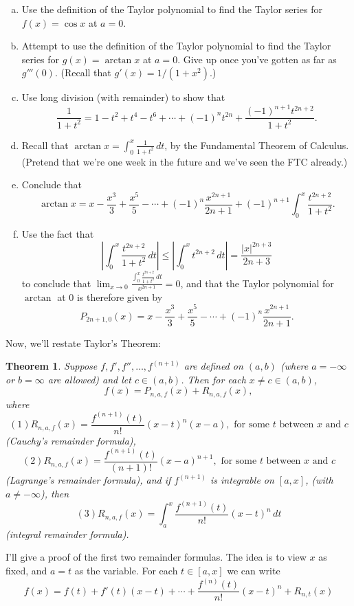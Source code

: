 \documentclass[letterpaper,12pt]{article}
\newtheorem{theorem}{Theorem}
\newcommand{\abs}[1]{\lvert #1\rvert}
\newcommand{\Abs}[1]{\left| #1 \right|}
\begin{document}
\begin{enumerate}[(a)]
 \item Use the definition of the Taylor polynomial to find the Taylor series for $f(x)=\cos x$ at $a=0$.
 \item Attempt to use the definition of the Taylor polynomial to find the Taylor series for $g(x)=\arctan x$ at $a=0$. Give up once you've gotten as far as $g'''(0)$. (Recall that $g'(x) = 1/(1+x^2)$.)
 \item Use long division (with remainder) to show that
\[
 \frac{1}{1+t^2} = 1-t^2+t^4-t^6+\cdots+(-1)^nt^{2n}+\frac{(-1)^{n+1}t^{2n+2}}{1+t^2}.
\]
 \item Recall that $\displaystyle \arctan x = \int_0^x\frac{1}{1+t^2}\,dt$, by the Fundamental Theorem of Calculus. (Pretend that we're one week in the future and we've seen the FTC already.)
 \item Conclude that
\[
 \arctan x = x-\frac{x^3}{3}+\frac{x^5}{5}-\cdots + (-1)^n\frac{x^{2n+1}}{2n+1}+(-1)^{n+1}\int_0^x \frac{t^{2n+2}}{1+t^2}.
\]
 \item Use the fact that
\[
 \Abs{\int_0^x\frac{t^{2n+2}}{1+t^2}\,dt}\leq \Abs{\int_0^xt^{2n+2}\,dt} = \frac{\abs{x}^{2n+3}}{2n+3}
\]
to conclude that $\displaystyle \lim_{x\to 0}\frac{\displaystyle \int_0^x \frac{t^{2n+2}}{1+t^2}\,dt}{x^{2n+1}} = 0$, and that the Taylor polynomial for $\arctan$ at 0 is therefore given by
\[
 P_{2n+1,0}(x) = x-\frac{x^3}{3}+\frac{x^5}{5}-\cdots+(-1)^n\frac{x^{2n+1}}{2n+1}.
\]

\end{enumerate}
Now, we'll restate Taylor's Theorem:
\begin{theorem}
 Suppose $f, f', f'', \ldots, f^{(n+1)}$ are defined on $(a,b)$ (where $a=-\infty$ or $b=\infty$ are allowed) and let $c\in (a,b)$. Then for each $x\neq c\in (a,b)$,
\[
 f(x) = P_{n,a,f}(x)+R_{n,a,f}(x), 
\]
where
\[
 (1) R_{n,a,f}(x)  = \frac{f^{(n+1)}(t)}{n!}(x-t)^n(x-a), \text{ for some } t \text{ between } x \text{ and } c
\]
(Cauchy's remainder formula),
\[
 (2) R_{n,a,f}(x)  = \frac{f^{(n+1)}(t)}{(n+1)!}(x-a)^{n+1}, \text{ for some } t \text{ between } x \text{ and } c
\]
(Lagrange's remainder formula), and if $f^{(n+1)}$ is integrable on $[a,x]$, (with $a\neq -\infty$), then
\[
 (3) R_{n,a,f}(x)  = \int_a^x \frac{f^{(n+1)}(t)}{n!}(x-t)^n\,dt
\]
(integral remainder formula).
\end{theorem}
I'll give a proof of the first two remainder formulas. The idea is to view $x$ as fixed, and $a=t$ as the variable. For each $t\in [a,x]$ we can write
\[
 f(x) = f(t)+f'(t)(x-t)+\cdots+\frac{f^{(n)}(t)}{n!}(x-t)^n+R_{n,t}(x)
\]
\end{document}
